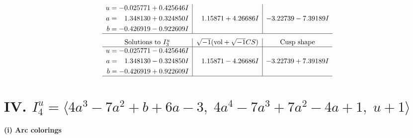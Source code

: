 \documentclass[1p]{elsarticle_modified}
\theoremstyle{definition}
\newcommand{\I}{\sqrt{-1}}
\begin{document}
$$\begin{array}{c|c|c}
\begin{aligned}
u &= -0.025771 + 0.425646 I \\
a &= \phantom{-}1.348130 + 0.324850 I \\
b &= -0.426919 - 0.922609 I\end{aligned}
 & \phantom{-}1.15871 + 4.26686 I & -3.22739 - 7.39189 I\\
 \hline 
 \end{array}$$\newpage$$\begin{array}{c|c|c}  
\text{Solutions to }I^u_{3}& \I (\text{vol} + \sqrt{-1}CS) & \text{Cusp shape}\\
 \hline 
\begin{aligned}
u &= -0.025771 - 0.425646 I \\
a &= \phantom{-}1.348130 - 0.324850 I \\
b &= -0.426919 + 0.922609 I\end{aligned}
 & \phantom{-}1.15871 - 4.26686 I & -3.22739 + 7.39189 I\\
 \hline 
 \end{array}$$\newpage\newpage\renewcommand{\arraystretch}{1}
\centering \section*{IV. $I^u_{4}= \langle 4 a^3-7 a^2+b+6 a-3,\;4 a^4-7 a^3+7 a^2-4 a+1,\;u+1 \rangle$}
\flushleft \textbf{(i) Arc colorings}\\
\end{document}
